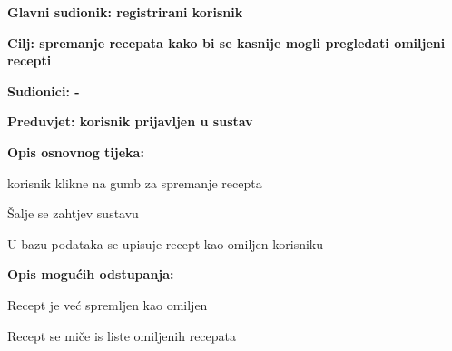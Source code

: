 					\noindent {}
					\begin{packed_item}
						\item \textbf{Glavni sudionik: registrirani korisnik}
						\item  \textbf{Cilj: spremanje recepata kako bi se kasnije mogli pregledati omiljeni recepti}
						\item  \textbf{Sudionici: -}
						\item  \textbf{Preduvjet: korisnik prijavljen u sustav}
						
						\item  \textbf{Opis osnovnog tijeka:}
						\item[] \begin{packed_enum}
							\item korisnik klikne na gumb za spremanje recepta
							\item Šalje se zahtjev sustavu
							\item U bazu podataka se upisuje recept kao omiljen korisniku
						\end{packed_enum}
						
						\item  \textbf{Opis mogućih odstupanja:}
						\item[] \begin{packed_item}
							\item[3.a] Recept je već spremljen kao omiljen
							\begin{packed_enum}
								\item Recept se miče is liste omiljenih recepata
							\end{packed_enum}
						\end{packed_item}
					\end{packed_item}
				
				
				
